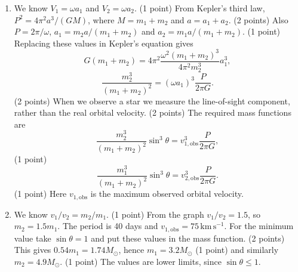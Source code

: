 \begin{enumerate}
\item We know $V_1=\omega a_1$ and $V_2=\omega a_2$. \hfill(1 point)
From Kepler's third law, $P^2=4\pi^2a^3/(GM)$, where $M=m_1+m_2$ and $a=a_1+a_2$. \hfill(2 points)
Also $P=2\pi/\omega$, $a_1=m_2a/(m_1+m_2)$ and $a_2=m_1a/(m_1+m_2)$. \hfill(1 point)
Replacing these values in Kepler's equation gives
\[G(m_1+m_2)=4\pi^2\frac{\omega^2(m_1+m_2)^3}{4\pi^2m_2^3}a_1^3,\]
\[\frac{m_2^3}{(m_1+m_2)^2}=(\omega a_1)^3\frac P{2\pi G}.\]
\hfill(2 points)
When we observe a star we measure the line-of-sight component, rather than the real orbital velocity. \hfill(2 points)
The required mass functions are
\[\frac{m_2^3}{(m_1+m_2)^2}\sin^3\theta=v_{1,\mathrm{obs}}^3\frac P{2\pi G},\]
\hfill(1 point)
\[\frac{m_1^3}{(m_1+m_2)^2}\sin^3\theta=v_{2,\mathrm{obs}}^3\frac P{2\pi G}.\]
\hfill(1 point)
Here $v_{1,\mathrm{obs}}$ is the maximum observed orbital velocity.
\item We know $v_1/v_2=m_2/m_1$. \hfill(1 point)
From the graph $v_1/v_2=1.5$, so $m_2=1.5m_1$. The period is 40 days and $v_{1,\mathrm{obs}}=75\,\mathrm{km\,s^{-1}}$. For the minimum value take $\sin\theta=1$ and put these values in the mass function. \hfill(2 points)
This gives $0.54m_1=1.74M_\odot$, hence $m_1=3.2M_\odot$ \hfill(1 point)
and similarly $m_2=4.9M_\odot$. \hfill(1 point)
The values are lower limits, since $\sin\theta\leq1$.
\end{enumerate}
